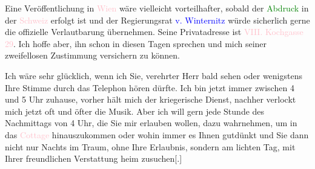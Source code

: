 \pstart
           Eine Veröffentlichung in \textcolor{pink}{Wien}{}\ledrightnote{\textcolor{pink}{Wien}} wäre vielleicht
               vorteilhafter, sobald der \textcolor{green}{Abdruck}{}\ledrightnote{{$\rightarrow$}\textcolor{green}{Une protestation d’Arthur Schnitzler}} in der \textcolor{pink}{Schweiz}{}\ledrightnote{\textcolor{pink}{Schweiz}} erfolgt ist und
               der Regierungsrat \textcolor{blue}{v. Winternitz}{}\ledrightnote{\textcolor{blue}{Jakob von Winternitz}} würde
               sicherlich gerne die offizielle Verlautbarung übernehmen. Seine Privatadresse ist \textcolor{pink}{VIII. Kochgasse 29}{}\ledrightnote{\textcolor{pink}{Kochgasse 29}}. Ich hoffe aber, ihn schon
               in diesen Tagen sprechen und mich seiner zweifellosen Zustimmung versichern zu
               können. \pend
           
\pstart
           Ich wäre sehr glücklich, wenn ich Sie, verehrter Herr \label{K_L03683-2v}\label{} bald sehen oder wenigstens Ihre Stimme durch das
               Telephon hören dürfte. Ich bin jetzt {\pb}immer zwischen 4 und 5 Uhr zuhause, vorher hält mich der kriegerische Dienst,
               nachher verlockt mich jetzt oft und öfter die Musik. Aber ich will gern jede Stunde
               des Nachmittags von 4 Uhr, die Sie mir erlauben wollen, dazu wahrnehmen, um in das
                  \textcolor{pink}{Cottage}{}\ledrightnote{\textcolor{pink}{Währinger Cottage}} hinauszukommen oder wohin immer es
               Ihnen gutdünkt und Sie dann nicht nur Nachts im
               Traum, ohne Ihre Erlaubnis, sondern am lichten Tag, mit Ihrer freundlichen
               Verstattung heim \introOben{}zu\introOben{}suchen{[}.{]}\pend
           
